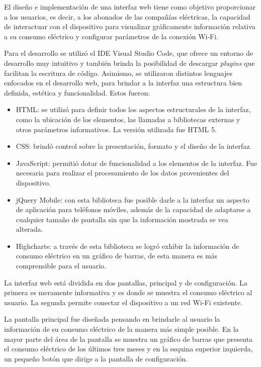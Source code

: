El diseño e implementación de una interfaz web tiene como objetivo proporcionar a los usuarios, es decir, a los abonados de las compañías eléctricas, la capacidad de interactuar con el dispositivo para visualizar gráficamente información relativa a su consumo eléctrico y configurar parámetros de la conexión Wi-Fi.

Para el desarrollo se utilizó el IDE Visual Studio Code, que ofrece un entorno de desarrollo muy intuitivo y también brinda la posibilidad de descargar \textit{plugins} que facilitan la escritura de código. Asimismo, se utilizaron distintos lenguajes enfocados en el desarrollo web, para brindar a la interfaz una estructura bien definida, estética y funcionalidad. Estos fueron:

\begin{itemize}
	\item HTML: se utilizó para definir todos los aspectos estructurales de la interfaz, como la ubicación de los elementos, las llamadas a bibliotecas externas y otros parámetros informativos. La versión utilizada fue HTML 5.
	\item CSS: brindó control sobre la presentación, formato y el diseño de la interfaz.
	\item JavaScript: permitió dotar de funcionalidad a los elementos de la interfaz. Fue necesaria para realizar el procesamiento de los datos provenientes del dispositivo.
	\item jQuery Mobile: con esta biblioteca fue posible darle a la interfaz un aspecto de aplicación para teléfonos móviles, además de la capacidad de adaptarse a cualquier tamaño de pantalla sin que la información mostrada se vea alterada.
	\item Highcharts: a través de esta biblioteca se logró exhibir la información de consumo eléctrico en un gráfico de barras, de esta manera es más comprensible para el usuario.\end{itemize}

La interfaz web está dividida en dos pantallas, principal y de configuración. La primera es meramente informativa y es donde se muestra el consumo eléctrico al usuario. La segunda permite conectar el dispositivo a un red Wi-Fi existente.

La pantalla principal fue diseñada pensando en brindarle al usuario la información de su consumo eléctrico de la manera más simple posible. En la mayor parte del área de la pantalla se muestra un gráfico de barras que presenta el consumo eléctrico de los últimos tres meses y en la esquina superior izquierda, un pequeño botón que dirige a la pantalla de configuración.


